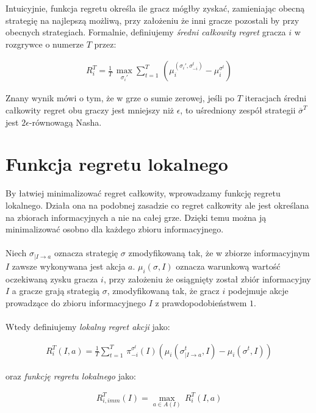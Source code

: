 \documentclass[licencjacka]{pracamgr}
\begin{document}
\noindent
Intuicyjnie, funkcja regretu określa ile gracz mógłby zyskać, zamieniając obecną strategię na najlepszą możliwą,
przy założeniu że inni gracze pozostali by przy obecnych strategiach. Formalnie, definiujemy \emph{średni całkowity regret} gracza $i$
w rozgrywce o numerze $T$ przez:

\begin{align*}
R_i^T = \frac{1}{T} \, \max_{\sigma_i'} \sum\limits_{t=1}^T \, (\mu_i^{(\sigma_i', \sigma_{-i}^t)} - \mu_i^{\sigma^t})
\end{align*}

\noindent
Znany wynik \cite{cfr} mówi o tym, że w grze o sumie zerowej, jeśli po $T$ iteracjach średni całkowity regret obu graczy
jest mniejszy niż $\epsilon$, to uśredniony zespół strategii $\overline{\sigma}^T$ jest $2\epsilon$-równowagą Nasha.

\section{Funkcja regretu lokalnego}

By łatwiej minimalizować regret całkowity, wprowadzamy funkcję regretu lokalnego.
Działa ona na podobnej zasadzie co regret całkowity ale jest określana na zbiorach informacyjnych
a nie na całej grze. Dzięki temu można ją minimalizować osobno dla każdego zbioru informacyjnego. \\\\

\noindent
Niech $\sigma_{|I \rightarrow a}$ oznacza strategię $\sigma$ zmodyfikowaną tak, że w zbiorze informacyjnym $I$ zawsze
wykonywana jest akcja $a$. $\mu_i(\sigma, I)$ oznacza warunkową wartość oczekiwaną zysku gracza $i$, przy założeniu że
osiągnięty został zbiór informacyjny $I$ a gracze grają strategią $\sigma$, zmodyfikowaną tak, że gracz $i$
podejmuje akcje prowadzące do zbioru informacyjnego $I$ z prawdopodobieństwem $1$. \\\\

\noindent
Wtedy definiujemy \emph{lokalny regret akcji} jako:

\begin{align*}
R_i^T(I, a) = \frac{1}{T} \sum\limits_{t=1}^{T} \, \pi_{-i}^{\sigma^t}(I)(\mu_i(\sigma^t_{|I \rightarrow a}, I) - \mu_i(\sigma^t, I))
\end{align*}

\noindent
oraz \emph{funkcję regretu lokalnego} jako:

\begin{align*}
R_{i, imm}^T(I) = \max_{a \in A(I)} \, R_i^T(I, a)
\end{align*}
\end{document}

